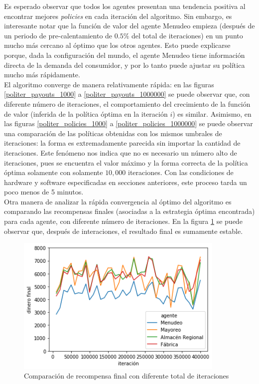 Es esperado observar  que todos los agentes presentan una tendencia positiva al encontrar mejores \textit{policies} en cada iteraci\'on del algoritmo. Sin embargo, es interesante notar que la funci\'on de valor del agente Menudeo empieza (despu\'es de un periodo de pre-calentamiento de $0.5\%$ del total de iteraciones) en un punto mucho m\'as cercano al \'optimo que los otros agentes. Esto puede explicarse porque, dada la configuraci\'on del mundo, el agente Menudeo tiene informaci\'on directa de la demanda del consumidor, y por lo tanto puede ajustar su pol\'itica mucho m\'as r\'apidamente.\\

El algoritmo converge de manera relativamente r\'apida: en las figuras  \ref{politer_payouts_1000} a \ref{politer_payouts_1000000} se puede observar que, con diferente n\'umero de iteraciones, el comportamiento del crecimiento de la funci\'on de valor (inferida de la pol\'itica \'optima en la iteraci\'on $i$) es similar. Asimismo, en las figuras \ref{politer_policies_1000} a \ref{politer_policies_1000000} se puede observar una comparaci\'on de las pol\'iticas obtenidas con los mismos umbrales de iteraciones: la forma es extremadamente parecida sin importar la cantidad de iteraciones. Este fen\'omeno nos indica que no es necesario un n\'umero alto de iteraciones, pues se encuentra el valor m\'aximo y la forma correcta de la pol\'itica \'optima solamente con solamente $10,000$ iteraciones. Con las condiciones de hardware y software especificadas en secciones anteriores, este proceso tarda un poco menos de 5 minutos.\\

Otra manera de analizar la r\'apida convergencia al \'optimo del algoritmo es comparando las recompensas finales (asociadas a la estrategia \'optima encontrada) para cada agente, con diferente n\'umero de iteraciones. En la figura \ref{money_over_time} se puede observar que, despu\'es de interaciones, el resultado final es sumamente estable.\\

\begin{figure}[H]
\caption{Comparaci\'on de recompensa final con diferente total de iteraciones}
\label{money_over_time}
\includegraphics[width=10cm]{tesis_tex/figs/evaluating_interations_money.png}
\centering
\end{figure}


